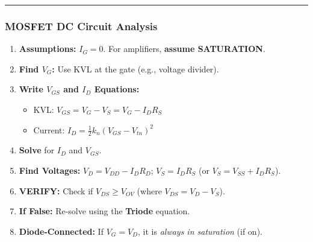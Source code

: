 \documentclass[10pt]{article}
\begin{document}
\begin{multicols}{2}
\hrule

\subsubsection*{MOSFET DC Circuit Analysis}
\begin{enumerate}
    \item \textbf{Assumptions:} \( I_G = 0 \). For amplifiers, \textbf{assume SATURATION}.
    \item \textbf{Find $V_G$:} Use KVL at the gate (e.g., voltage divider).
    \item \textbf{Write $V_{GS}$ and $I_D$ Equations:}
    \begin{itemize}
        \item KVL: \( V_{GS} = V_G - V_S = V_G - I_D R_S \)
        \item Current: \( I_D = \frac{1}{2} k_n (V_{GS} - V_{tn})^2 \)
    \end{itemize}
    \item \textbf{Solve} for $I_D$ and $V_{GS}$.
    \item \textbf{Find Voltages:} \( V_D = V_{DD} - I_D R_D \); \( V_S = I_D R_S \) (or \( V_S = V_{SS} + I_D R_S \)).
    \item \textbf{VERIFY:} Check if \( V_{DS} \ge V_{OV} \) (where \( V_{DS} = V_D - V_S \)).
    \item \textbf{If False:} Re-solve using the \textbf{Triode} equation.
    \item \textbf{Diode-Connected:} If $V_G = V_D$, it is \textit{always in saturation} (if on).
\end{enumerate}


\end{multicols}
\end{document}
